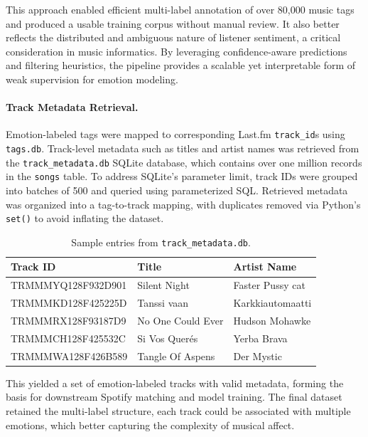 \documentclass{article}
\begin{document}
This approach enabled efficient multi-label annotation of over 80,000 music tags and produced a usable training corpus without manual review. It also better reflects the distributed and ambiguous nature of listener sentiment, a critical consideration in music informatics. By leveraging confidence-aware predictions and filtering heuristics, the pipeline provides a scalable yet interpretable form of weak supervision for emotion modeling.

\paragraph{Track Metadata Retrieval.}

Emotion-labeled tags were mapped to corresponding Last.fm \texttt{track\_id}s using \texttt{tags.db}. Track-level metadata such as titles and artist names was retrieved from the \texttt{track\_metadata.db} SQLite database, which contains over one million records in the \texttt{songs} table. To address SQLite’s parameter limit, track IDs were grouped into batches of 500 and queried using parameterized SQL. Retrieved metadata was organized into a tag-to-track mapping, with duplicates removed via Python’s \texttt{set()} to avoid inflating the dataset.

\begin{table}[H]
\centering
\begin{tabular}{|l|l|l|}
\hline
\textbf{Track ID} & \textbf{Title} & \textbf{Artist Name} \\
\hline
TRMMMYQ128F932D901 & Silent Night & Faster Pussy cat \\
TRMMMKD128F425225D & Tanssi vaan & Karkkiautomaatti \\
TRMMMRX128F93187D9 & No One Could Ever & Hudson Mohawke \\
TRMMMCH128F425532C & Si Vos Querés & Yerba Brava \\
TRMMMWA128F426B589 & Tangle Of Aspens & Der Mystic \\
\hline
\end{tabular}
\caption{Sample entries from \texttt{track\_metadata.db}.}
\end{table}

This yielded a set of emotion-labeled tracks with valid metadata, forming the basis for downstream Spotify matching and model training. The final dataset retained the multi-label structure, each track could be associated with multiple emotions, which better capturing the complexity of musical affect.

\end{document}
